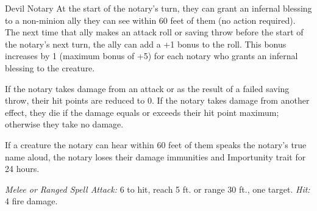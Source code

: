 \documentclass[10pt,a4paper,twoside,bg=print,twocolumn,openany,nodeprecatedcode]{dndbook}
\begin{document}
\begin{DndMonster}[float=t]{Devil Notary}
\DndMonsterBasics[
armor-class = {15 (\textit{chain shirt})},
hit-points = {\DndDice{13}},
speed = {30 ft.}
]
\DndMonsterAbilityScores[
 str = 11,
 dex = 15,
 con = 14,
 int = 12,
 wis = 14,
 cha = 16
]
\DndMonsterDetails[
damage-immunities = {fire},
senses = {darkvision 120 ft., passive perception 12},
languages = {Common, Infernal},
challenge = 6,
]
At the start of the notary's turn, they can grant an infernal blessing to a non-minion ally they can see within 60 feet of them (no action required). The next time that ally makes an attack roll or saving throw before the start of the notary's next turn, the ally can add a +1 bonus to the roll. This bonus increases by 1 (maximum bonus of +5) for each notary who grants an infernal blessing to the creature.

If the notary takes damage from an attack or as the result of a failed saving throw, their hit points are reduced to 0. If the notary takes damage from another effect, they die if the damage equals or exceeds their hit point maximum; otherwise they take no damage.

If a creature the notary can hear within 60 feet of them speaks the notary's true name aloud, the notary loses their damage immunities and Importunity trait for 24 hours.

\textsl{Melee or Ranged Spell Attack:} 6 to hit, reach 5 ft. or range 30 ft., one target. \textsl{Hit:} 4 fire damage.

\end{DndMonster}
\end{document}

